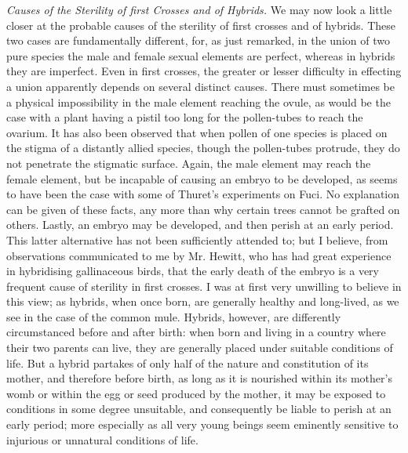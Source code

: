 \indent \emph{Causes of the Sterility of first Crosses and of Hybrids.} We may now look a little closer at the probable causes of the sterility of first crosses and of hybrids. These two cases are fundamentally different, for, as just remarked, in the union of two pure species the male and female sexual elements are perfect, whereas in hybrids they are imperfect. Even in first crosses, the greater or lesser difficulty in effecting a union apparently depends on several distinct causes. There must sometimes be a physical impossibility in the male element reaching the ovule, as would be the case with a plant having a pistil too long for the pollen-tubes to reach the ovarium. It has also been observed that when pollen of one species is placed on the stigma of a distantly allied species, though the pollen-tubes protrude, they do not penetrate the stigmatic surface. Again, the male element may reach the female element, but be incapable of causing an embryo to be developed, as seems to have been the case with some of Thuret's experiments on Fuci. No explanation can be given of these facts, any more than why certain trees cannot be grafted on others. Lastly, an embryo may be developed, and then perish at an early period. This latter alternative has not been sufficiently attended to; but I believe, from observations communicated to me by Mr. Hewitt, who has had great experience in hybridising gallinaceous birds, that the early death of the embryo is a very frequent cause of sterility in first crosses. I was at first very unwilling to believe in this view; as hybrids, when once born, are generally healthy and long-lived, as we see in the case of the common mule. Hybrids, however, are differently circumstanced before and after birth: when born and living in a country where their two parents can live, they are generally placed under suitable conditions of life. But a hybrid partakes of only half of the nature and constitution of its mother, and therefore before birth, as long as it is nourished within its mother's womb or within the egg or seed produced by the mother, it may be exposed to conditions in some degree unsuitable, and consequently be liable to perish at an early period; more especially as all very young beings seem eminently sensitive to injurious or unnatural conditions of life.\\
